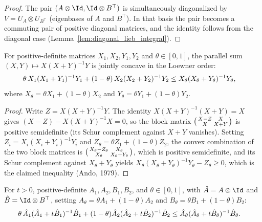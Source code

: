 \begin{proof}\leanok
    The pair $(A\otimes\Id,\Id\otimes B^\top)$ is simultaneously diagonalized
    by $V=U_A\otimes U_{B^\top}$ (eigenbases of $A$ and $B^\top$).
    In that basis the pair becomes a commuting pair of positive diagonal
    matrices, and the identity follows from the diagonal case
    (Lemma~\ref{lem:diagonal_lieb_integral}).
\end{proof}

\begin{lemma}\label{lem:parallel_sum_concave}
    \leanok
    For positive-definite matrices $X_1,X_2,Y_1,Y_2$ and
    $\theta\in[0,1]$, the parallel sum
    $(X,Y)\mapsto X(X+Y)^{-1}Y$ is jointly concave in the Loewner order:
    \begin{align}
        \theta\,X_1(X_1+Y_1)^{-1}Y_1
        +(1-\theta)\,X_2(X_2+Y_2)^{-1}Y_2
        &\le
        X_\theta(X_\theta+Y_\theta)^{-1}Y_\theta,
        \notag
    \end{align}
    where $X_\theta=\theta X_1+(1-\theta)X_2$ and
    $Y_\theta=\theta Y_1+(1-\theta)Y_2$.
\end{lemma}

\begin{proof}\leanok
    Write $Z=X(X+Y)^{-1}Y$. The identity
    $X(X+Y)^{-1}(X+Y)=X$ gives
    $(X-Z)-X(X+Y)^{-1}X=0$, so the block matrix
    $\begin{psmallmatrix}X-Z & X\\X & X+Y\end{psmallmatrix}$ is positive
    semidefinite (its Schur complement against $X+Y$ vanishes).
    Setting $Z_i=X_i(X_i+Y_i)^{-1}Y_i$ and
    $Z_\theta=\theta Z_1+(1-\theta)Z_2$, the convex combination of the two
    block matrices is
    $\begin{psmallmatrix}X_\theta-Z_\theta & X_\theta\\
    X_\theta & X_\theta+Y_\theta\end{psmallmatrix}$, which is positive
    semidefinite, and its Schur complement against $X_\theta+Y_\theta$ yields
    $X_\theta(X_\theta+Y_\theta)^{-1}Y_\theta-Z_\theta\ge0$, which is the
    claimed inequality (Ando, 1979).
\end{proof}

\begin{lemma}
    \label{lem:superop_resolvent_integrand_concave}
    \leanok
    For $t>0$, positive-definite $A_1,A_2,B_1,B_2$, and
    $\theta\in[0,1]$, with $\hat{A}=A\otimes\Id$ and
    $\hat{B}=\Id\otimes B^\top$, setting
    $A_\theta=\theta A_1+(1-\theta)A_2$ and
    $B_\theta=\theta B_1+(1-\theta)B_2$:
    \begin{align}
        \theta\,\hat A_1(\hat A_1+t\hat B_1)^{-1}\hat B_1
        +(1-\theta) \hat A_2(\hat A_2+t\hat B_2)^{-1}\hat B_2
        &\le
        \hat A_\theta(\hat A_\theta+t\hat B_\theta)^{-1}\hat B_\theta.
        \notag
    \end{align}
\end{lemma}

